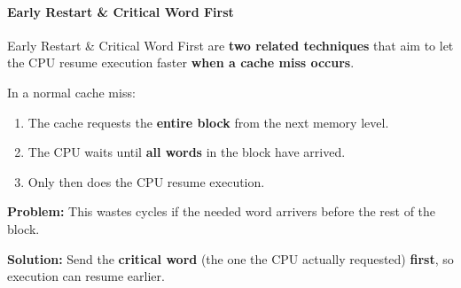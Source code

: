 \paragraph{Early Restart \& Critical Word First}

Early Restart \& Critical Word First are \textbf{two related techniques} that aim to let the CPU resume execution faster \textbf{when a cache miss occurs}.

\highspace
In a normal cache miss:
\begin{enumerate}
    \item The cache requests the \textbf{entire block} from the next memory level.
    \item The CPU waits until \textbf{all words} in the block have arrived.
    \item Only then does the CPU resume execution.
\end{enumerate}
\textcolor{Red2}{ \textbf{Problem:}} This wastes cycles if the needed word arrivers before the rest of the block.

\highspace
\textcolor{Green3}{ \textbf{Solution:}} Send the \textbf{critical word} (the one the CPU actually requested) \textbf{first}, so execution can resume earlier.

